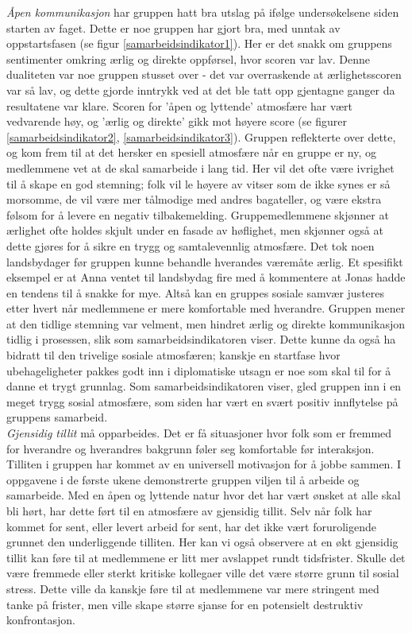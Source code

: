 \emph{Åpen kommunikasjon} har gruppen hatt bra utslag på ifølge undersøkelsene siden starten av faget. 
Dette er noe gruppen har gjort bra, med unntak av oppstartsfasen (se figur \ref{samarbeidsindikator1}).
Her er det snakk om gruppens sentimenter omkring ærlig og direkte oppførsel, hvor scoren var lav.
Denne dualiteten var noe gruppen stusset over - det var overraskende at ærlighetsscoren var så lav, og dette gjorde inntrykk ved at det ble tatt opp gjentagne ganger da resultatene var klare.
Scoren for 'åpen og lyttende' atmosfære har vært vedvarende høy, og 'ærlig og direkte' gikk mot høyere score (se figurer \ref{samarbeidsindikator2}, \ref{samarbeidsindikator3}).
Gruppen reflekterte over dette, og kom frem til at det hersker en spesiell atmosfære når en gruppe er ny, og medlemmene vet at de skal samarbeide i lang tid.
Her vil det ofte være ivrighet til å skape en god stemning; folk vil le høyere av vitser som de ikke synes er så morsomme, de vil være mer tålmodige med andres bagateller, og være ekstra følsom for å levere en negativ tilbakemelding.
Gruppemedlemmene skjønner at ærlighet ofte holdes skjult under en fasade av høflighet, men skjønner også at dette gjøres for å sikre en trygg og samtalevennlig atmosfære. Det tok noen landsbydager før gruppen kunne behandle hverandes væremåte ærlig.
Et spesifikt eksempel er at Anna ventet til landsbydag fire med å kommentere at Jonas hadde en tendens til å snakke for mye. 
Altså kan en gruppes sosiale samvær justeres etter hvert når medlemmene er mere komfortable med hverandre. 
Gruppen mener at den tidlige stemning var velment, men hindret ærlig og direkte kommunikasjon tidlig i prosessen, slik som samarbeidsindikatoren viser. 
Dette kunne da også ha bidratt til den trivelige sosiale atmosfæren; kanskje en startfase hvor ubehageligheter pakkes godt inn i diplomatiske utsagn er noe som skal til for å danne et trygt grunnlag.
Som samarbeidsindikatoren viser, gled gruppen inn i en meget trygg sosial atmosfære, som siden har vært en svært positiv innflytelse på gruppens samarbeid.\\

\emph{Gjensidig tillit} må opparbeides. Det er få situasjoner hvor folk som er fremmed for hverandre og hverandres bakgrunn føler seg komfortable før interaksjon.
Tilliten i gruppen har kommet av en universell motivasjon for å jobbe sammen. 
I oppgavene i de første ukene demonstrerte gruppen viljen til å  arbeide og samarbeide.
Med en åpen og lyttende natur hvor det har vært ønsket at alle skal bli hørt, har dette ført til en atmosfære av gjensidig tillit. 
Selv når folk har kommet for sent, eller levert arbeid for sent, har det ikke vært foruroligende grunnet den underliggende tilliten.
Her kan vi også observere at en økt gjensidig tillit kan føre til at medlemmene er litt mer avslappet rundt tidsfrister. Skulle det være fremmede eller sterkt kritiske kollegaer ville det være større grunn til sosial stress.
Dette ville da kanskje føre til at medlemmene var mere stringent med tanke på frister, men ville skape større sjanse for en potensielt destruktiv konfrontasjon.\\

